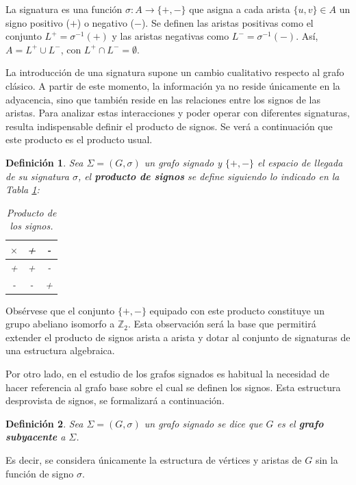\documentclass[11pt,a4paper,spanish]{report}
\theoremstyle{plain}
\newtheorem{definicion}{Definición}[chapter]
\begin{document}
La signatura es una función $\sigma: A \longrightarrow \{+, -\}$  que asigna a cada arista $ \{u,v\} \in A$ un signo positivo (\(+\)) o negativo (\(-\)). Se definen las aristas positivas como el conjunto $L^+ = \sigma^{-1}(+)$ y las aristas negativas como $L^- = \sigma^{-1}(-)$. Así, $A= L^+ \cup L^-$, con $L^+ \cap L^- = \emptyset$.
 
La introducción de una signatura supone un cambio cualitativo respecto al grafo clásico. A partir de este momento, la información ya no reside únicamente en la adyacencia, sino que también reside en las relaciones entre los signos de las aristas. Para analizar estas interacciones y poder operar con diferentes signaturas, resulta indispensable definir el producto de signos. Se verá a continuación que este producto es el producto usual.

\begin{definicion}\cite{harary1953notion}
Sea $\Sigma=(G,\sigma)$ un grafo signado y $\{+, -\}$ el espacio de llegada de su signatura $\sigma$, el \textbf{producto de signos} se define siguiendo lo indicado en la Tabla \ref{tabla: signos}:
\begin{table}[h!]
    \centering
    \begin{tabular}{c|cc}
        
        \textbf{$\times$} & + & - \\
        \hline
        + & + & - \\
        
        - & - & + \\
        
    \end{tabular}
    \caption{Producto de los signos.}
    \label{tabla: signos}
\end{table}
\end{definicion} 

Obsérvese que el conjunto $\{+,-\}$ equipado con este producto constituye un
grupo abeliano isomorfo a $\mathbb{Z}_2$. Esta observación será la base que permitirá extender el producto de signos arista a
arista y dotar al conjunto de signaturas de una estructura algebraica.

Por otro lado, en el estudio de los grafos signados es habitual la necesidad de hacer referencia al grafo base sobre el cual se definen los signos. Esta estructura desprovista de signos, se formalizará a continuación.

\begin{definicion}
Sea $\Sigma=(G,\sigma)$ un \emph{grafo signado} se dice que  $G$ es el \textbf{grafo subyacente} a $\Sigma$.
\end{definicion} 
Es decir, se considera únicamente 
la estructura de vértices y aristas de $G$ sin la función de signo $\sigma$.
\end{document}
